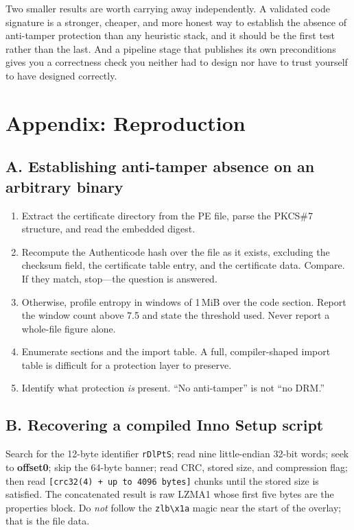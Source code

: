 Two smaller results are worth carrying away independently. A validated code
signature is a stronger, cheaper, and more honest way to establish the absence of
anti-tamper protection than any heuristic stack, and it should be the first test
rather than the last. And a pipeline stage that publishes its own preconditions
gives you a correctness check you neither had to design nor have to trust
yourself to have designed correctly.

\section*{Appendix: Reproduction}
\label{sec:appendix}

\subsection*{A. Establishing anti-tamper absence on an arbitrary binary}

\begin{enumerate}
\item Extract the certificate directory from the PE file, parse the PKCS\#7
      structure, and read the embedded digest.
\item Recompute the Authenticode hash over the file as it exists, excluding the
      checksum field, the certificate table entry, and the certificate data.
      Compare. If they match, stop---the question is answered.
\item Otherwise, profile entropy in windows of 1\,MiB over the code section.
      Report the window count above 7.5 and state the threshold used. Never
      report a whole-file figure alone.
\item Enumerate sections and the import table. A full, compiler-shaped import
      table is difficult for a protection layer to preserve.
\item Identify what protection \emph{is} present. ``No anti-tamper'' is not ``no
      DRM.''
\end{enumerate}

\subsection*{B. Recovering a compiled Inno Setup script}

Search for the 12-byte identifier \verb|rDlPtS|; read nine little-endian 32-bit
words; seek to \textbf{offset0}; skip the 64-byte banner; read CRC, stored size,
and compression flag; then read \verb|[crc32(4) + up to 4096 bytes]| chunks until
the stored size is satisfied. The concatenated result is raw LZMA1 whose first
five bytes are the properties block. Do \emph{not} follow the \verb|zlb\x1a|
magic near the start of the overlay; that is the file data.

